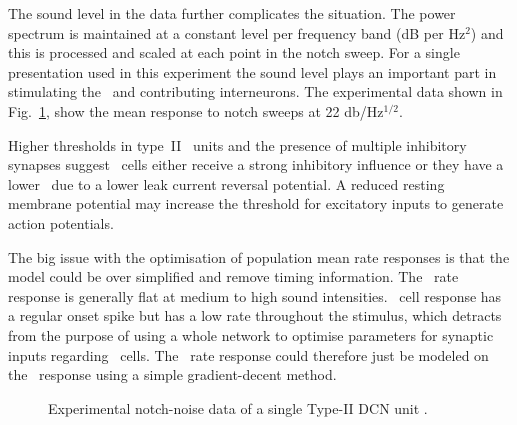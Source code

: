 \smallskip{}

The sound level in the \citet{ReissYoung:2005} data further complicates the
situation.  The power spectrum is maintained at a constant level per frequency
band (dB per Hz$^2$) and this is processed and scaled at each point in the notch
sweep.  For a single presentation used in this experiment the sound level plays
an important part in stimulating the \ANFs~and contributing interneurons.  The
experimental data shown in Fig.~\ref{fig:TVReissFig9}, show the mean response to
notch sweeps at 22 db/Hz$^{1/2}$.

\smallskip{}

Higher thresholds in type~II \DCN~units \citep{SpirouDavisEtAl:1999} and the
presence of multiple inhibitory synapses \citep{Alibardi:2006} suggest \TV~cells
either receive a strong inhibitory influence or they have a lower \RMP~due to a
lower leak current reversal potential. A reduced resting membrane potential may
increase the threshold for excitatory inputs to generate action potentials.


\smallskip{}

The big issue with the optimisation of population mean rate responses is that
the model could be over simplified and remove timing information.  The \HSR~rate
response is generally flat at medium to high sound intensities. \DS~cell
response has a regular onset spike but has a low rate throughout the stimulus,
which detracts from the purpose of using a whole network to optimise parameters
for synaptic inputs regarding \TV~cells.  The \TV~rate response could therefore
just be modeled on the \LSR~response using a simple gradient-decent
method. 
 
\smallskip{}


\begin{figure}[htb]
  \centering {}
  \caption[Experimental notch-noise data of a single Type-II DCN unit]{Experimental notch-noise data of a single Type-II DCN unit
    \citep[,~Fig.~9]{ReissYoung:2005}.}
  \label{fig:TVReissFig9}
\end{figure}


